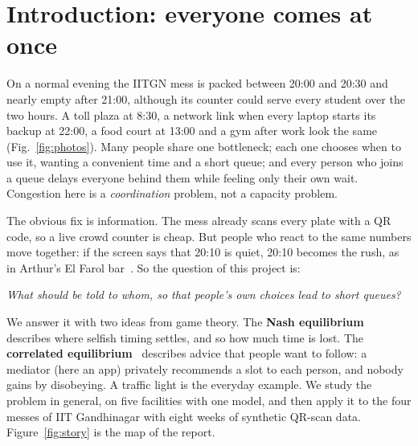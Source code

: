 \documentclass{article}
\begin{document}

\section{Introduction: everyone comes at once}

On a normal evening the IITGN mess is packed between 20:00 and 20:30 and nearly empty after 21:00, although its
counter could serve every student over the two hours. A toll plaza at 8:30, a network link when every laptop starts
its backup at 22:00, a food court at 13:00 and a gym after work look the same (Fig.~\ref{fig:photos}). Many people
share one bottleneck; each one chooses when to use it, wanting a convenient time and a short queue; and every person
who joins a queue delays everyone behind them while feeling only their own wait. Congestion here is a
\emph{coordination} problem, not a capacity problem.

The obvious fix is information. The mess already scans every plate with a QR code, so a live crowd counter is cheap.
But people who react to the same numbers move together: if the screen says that 20:10 is quiet, 20:10 becomes the
rush, as in Arthur's El Farol bar~\cite{arthur}. So the question of this project is:
\begin{center}\emph{What should be told to whom, so that people's own choices lead to short queues?}\end{center}

We answer it with two ideas from game theory. The \textbf{Nash equilibrium}~\cite{nash} describes where selfish
timing settles, and so how much time is lost. The \textbf{correlated equilibrium}~\cite{aumann} describes advice that
people want to follow: a mediator (here an app) privately recommends a slot to each person, and nobody gains by
disobeying. A traffic light is the everyday example. We study the problem in general, on five facilities with one
model, and then apply it to the four messes of IIT Gandhinagar with eight weeks of synthetic QR-scan data.
Figure~\ref{fig:story} is the map of the report.
\end{document}
